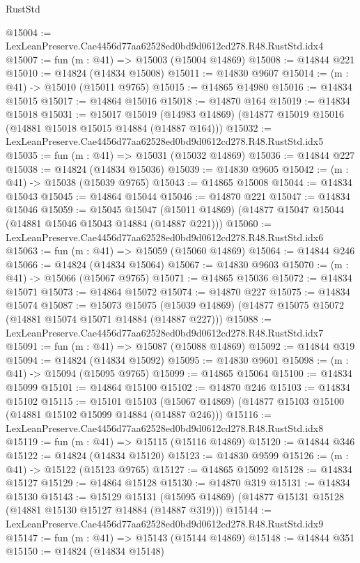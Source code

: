\begin{lexlean}{RustStd}
\begin{coremodule}
@15004 := LexLeanPreserve.Cae4456d77aa62528ed0bd9d0612cd278.R48.RustStd.idx4
@15007 := fun (m : @41) => @15003 (@15004 @14869)
@15008 := @14844 @221
@15010 := @14824 (@14834 @15008)
@15011 := @14830 @9607
@15014 := (m : @41) -> @15010 (@15011 @9765)
@15015 := @14865 @14980
@15016 := @14834 @15015
@15017 := @14864 @15016
@15018 := @14870 @164
@15019 := @14834 @15018
@15031 := @15017
    @15019
    (@14983 @14869)
    (@14877 @15019 @15016 (@14881 @15018 @15015 @14884 (@14887 @164)))
@15032 := LexLeanPreserve.Cae4456d77aa62528ed0bd9d0612cd278.R48.RustStd.idx5
@15035 := fun (m : @41) => @15031 (@15032 @14869)
@15036 := @14844 @227
@15038 := @14824 (@14834 @15036)
@15039 := @14830 @9605
@15042 := (m : @41) -> @15038 (@15039 @9765)
@15043 := @14865 @15008
@15044 := @14834 @15043
@15045 := @14864 @15044
@15046 := @14870 @221
@15047 := @14834 @15046
@15059 := @15045
    @15047
    (@15011 @14869)
    (@14877 @15047 @15044 (@14881 @15046 @15043 @14884 (@14887 @221)))
@15060 := LexLeanPreserve.Cae4456d77aa62528ed0bd9d0612cd278.R48.RustStd.idx6
@15063 := fun (m : @41) => @15059 (@15060 @14869)
@15064 := @14844 @246
@15066 := @14824 (@14834 @15064)
@15067 := @14830 @9603
@15070 := (m : @41) -> @15066 (@15067 @9765)
@15071 := @14865 @15036
@15072 := @14834 @15071
@15073 := @14864 @15072
@15074 := @14870 @227
@15075 := @14834 @15074
@15087 := @15073
    @15075
    (@15039 @14869)
    (@14877 @15075 @15072 (@14881 @15074 @15071 @14884 (@14887 @227)))
@15088 := LexLeanPreserve.Cae4456d77aa62528ed0bd9d0612cd278.R48.RustStd.idx7
@15091 := fun (m : @41) => @15087 (@15088 @14869)
@15092 := @14844 @319
@15094 := @14824 (@14834 @15092)
@15095 := @14830 @9601
@15098 := (m : @41) -> @15094 (@15095 @9765)
@15099 := @14865 @15064
@15100 := @14834 @15099
@15101 := @14864 @15100
@15102 := @14870 @246
@15103 := @14834 @15102
@15115 := @15101
    @15103
    (@15067 @14869)
    (@14877 @15103 @15100 (@14881 @15102 @15099 @14884 (@14887 @246)))
@15116 := LexLeanPreserve.Cae4456d77aa62528ed0bd9d0612cd278.R48.RustStd.idx8
@15119 := fun (m : @41) => @15115 (@15116 @14869)
@15120 := @14844 @346
@15122 := @14824 (@14834 @15120)
@15123 := @14830 @9599
@15126 := (m : @41) -> @15122 (@15123 @9765)
@15127 := @14865 @15092
@15128 := @14834 @15127
@15129 := @14864 @15128
@15130 := @14870 @319
@15131 := @14834 @15130
@15143 := @15129
    @15131
    (@15095 @14869)
    (@14877 @15131 @15128 (@14881 @15130 @15127 @14884 (@14887 @319)))
@15144 := LexLeanPreserve.Cae4456d77aa62528ed0bd9d0612cd278.R48.RustStd.idx9
@15147 := fun (m : @41) => @15143 (@15144 @14869)
@15148 := @14844 @351
@15150 := @14824 (@14834 @15148)

\end{coremodule}
\end{lexlean}
